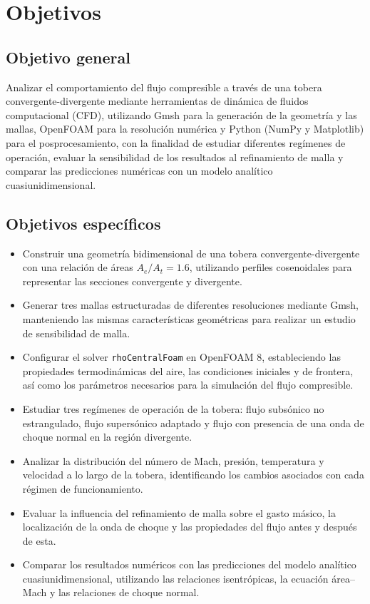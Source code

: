 \documentclass[12pt,letterpaper]{article}
\numberwithin{equation}{section}
\begin{document}
\newpage
\section{Objetivos}
\subsection{Objetivo general}
Analizar el comportamiento del flujo compresible a través de una
tobera convergente-divergente mediante herramientas de dinámica
de fluidos computacional (CFD), utilizando Gmsh para la
generación de la geometría y las mallas, OpenFOAM para la
resolución numérica y Python (NumPy y Matplotlib) para el posprocesamiento,
con la finalidad de estudiar diferentes regímenes de
operación, evaluar la sensibilidad de los resultados al
refinamiento de malla y comparar las predicciones numéricas
con un modelo analítico cuasiunidimensional.

\subsection{Objetivos específicos}
\begin{itemize}
\item Construir una geometría bidimensional de una
    tobera convergente-divergente con una relación de
    áreas $A_e/A_t = 1.6$, utilizando perfiles
    cosenoidales para representar las secciones
    convergente y divergente.

    \item Generar tres mallas estructuradas de diferentes
    resoluciones mediante Gmsh, manteniendo las mismas
    características geométricas para realizar un
    estudio de sensibilidad de malla.

    \item Configurar el solver \texttt{rhoCentralFoam}
    en OpenFOAM 8, estableciendo las propiedades
    termodinámicas del aire, las condiciones iniciales
    y de frontera, así como los parámetros necesarios
    para la simulación del flujo compresible.

    \item Estudiar tres regímenes de operación de la
    tobera: flujo subsónico no estrangulado, flujo
    supersónico adaptado y flujo con presencia de
    una onda de choque normal en la región divergente.

    \item Analizar la distribución del número de Mach,
    presión, temperatura y velocidad a lo largo de
    la tobera, identificando los cambios asociados
    con cada régimen de funcionamiento.

    \item Evaluar la influencia del refinamiento de
    malla sobre el gasto másico, la localización de
    la onda de choque y las propiedades del flujo
    antes y después de esta.

    \item Comparar los resultados numéricos con las
    predicciones del modelo analítico cuasiunidimensional,
    utilizando las relaciones isentrópicas, la ecuación
    área--Mach y las relaciones de choque normal.
\end{itemize}
\newpage
\end{document}
